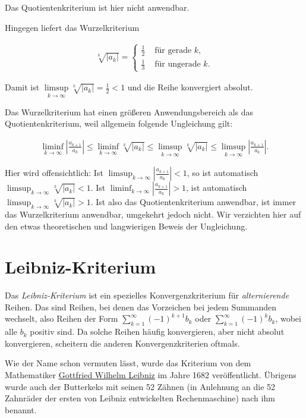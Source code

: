 \documentclass[fontsize=9pt,
               parskip=half-,
               DIV=14,
               listof=chapterentry,
               tocflat]{scrbook}
\begin{document}
Das Quotientenkriterium ist hier nicht anwendbar.

Hingegen liefert das Wurzelkriterium

\begin{align*}
{\sqrt[{k}]{|a_{k}|}}={\begin{cases}{\frac {1}{2}}&{\text{ für gerade }}k,\\{\frac {1}{3}}&{\text{ für ungerade }}k.\end{cases}}
\end{align*}

Damit ist $\limsup \limits _{k\to \infty }{\sqrt[{k}]{|a_{k}|}}={\frac {1}{2}}<1$ und die Reihe konvergiert absolut.

Das Wurzelkriterium hat einen größeren Anwendungsbereich als das Quotientenkriterium, weil allgemein folgende Ungleichung gilt:

\begin{align*}
\liminf _{k\to \infty }\left|{\frac {a_{k+1}}{a_{k}}}\right|\leq \liminf _{k\to \infty }{\sqrt[{k}]{|a_{k}|}}\leq \limsup _{k\to \infty }{\sqrt[{k}]{|a_{k}|}}\leq \limsup _{k\to \infty }\left|{\frac {a_{k+1}}{a_{k}}}\right|.
\end{align*}

Hier wird offensichtlich: Ist $\limsup _{k\to \infty }\left|{\frac {a_{k+1}}{a_{k}}}\right|<1$, so ist automatisch $\limsup _{k\to \infty }{\sqrt[{k}]{|a_{k}|}}<1$. Ist $\liminf _{k\to \infty }\left|{\frac {a_{k+1}}{a_{k}}}\right|>1$, ist automatisch $\limsup _{k\to \infty }{\sqrt[{k}]{|a_{k}|}}>1$. Ist also das Quotientenkriterium anwendbar, ist immer das Wurzelkriterium anwendbar, umgekehrt jedoch nicht. Wir verzichten hier auf den etwas theoretischen und langwierigen Beweis der Ungleichung.

\chapter{Leibniz-Kriterium}

Das \emph{Leibniz-Kriterium} ist ein spezielles Konvergenzkriterium für \emph{alternierende} Reihen. Das sind Reihen, bei denen das Vorzeichen bei jedem Summanden wechselt, also Reihen der Form $\sum _{k=1}^{\infty }(-1)^{k+1}b_{k}$ oder $\sum _{k=1}^{\infty }(-1)^{k}b_{k}$, wobei alle $b_{k}$ positiv sind. Da solche Reihen häufig konvergieren, aber nicht absolut konvergieren, scheitern die anderen Konvergenzkriterien oftmals.

Wie der Name schon vermuten lässt, wurde das Kriterium von dem Mathematiker \href{https://de.wikipedia.org/wiki/Gottfried\%20Wilhelm\%20Leibniz}
{Gottfried Wilhelm Leibniz} im Jahre 1682 veröffentlicht. Übrigens wurde auch der Butterkeks mit seinen 52 Zähnen (in Anlehnung an die 52 Zahnräder der ersten von Leibniz entwickelten Rechenmaschine) nach ihm benannt.
\end{document}

